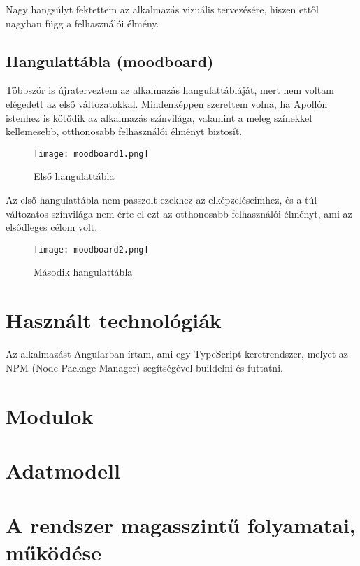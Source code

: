 \documentclass[a4paper,12pt]{report}
\begin{document}
Nagy hangsúlyt fektettem az alkalmazás vizuális tervezésére, hiszen ettől nagyban függ a felhasználói élmény.

\subsection{Hangulattábla (moodboard)}

Többször is újraterveztem az alkalmazás hangulattábláját, mert nem voltam elégedett az első változatokkal. Mindenképpen szerettem volna, ha Apollón istenhez is kötődik az alkalmazás színvilága, valamint a meleg színekkel kellemesebb, otthonosabb felhasználói élményt biztosít.

\begin{figure}
    \centering
    \texttt{[image: moodboard1.png]}
    \caption{Első hangulattábla}
    \label{fig:enter-label}
\end{figure}

Az első hangulattábla nem passzolt ezekhez az elképzeléseimhez, és a túl változatos színvilága nem érte el ezt az otthonosabb felhasználói élményt, ami az elsődleges célom volt.

\begin{figure}
    \centering
    \texttt{[image: moodboard2.png]}
    \caption{Második hangulattábla}
    \label{fig:enter-label}
\end{figure}

\section{Használt technológiák}

Az alkalmazást Angularban írtam, ami egy TypeScript keretrendszer, melyet az NPM (Node Package Manager) segítségével buildelni és futtatni. 

\section{Modulok}

\section{Adatmodell}

\section{A rendszer magasszintű folyamatai, működése}
\end{document}

